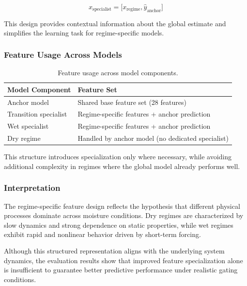 \begin{equation}
x_{\text{specialist}} = \big[x_{\text{regime}}, \hat{y}_{\text{anchor}}\big]
\end{equation}

This design provides contextual information about the global estimate and simplifies the learning task for regime-specific models.

\subsubsection*{Feature Usage Across Models}

\begin{table}[H]
\centering
\begin{tabular}{ll}
\toprule
\textbf{Model Component} & \textbf{Feature Set} \\
\midrule
Anchor model & Shared base feature set (28 features) \\
Transition specialist & Regime-specific features + anchor prediction \\
Wet specialist & Regime-specific features + anchor prediction \\
Dry regime & Handled by anchor model (no dedicated specialist) \\
\bottomrule
\end{tabular}
\caption{Feature usage across model components.}
\end{table}

This structure introduces specialization only where necessary, while avoiding additional complexity in regimes where the global model already performs well.

\subsubsection*{Interpretation}

The regime-specific feature design reflects the hypothesis that different physical processes dominate across moisture conditions. Dry regimes are characterized by slow dynamics and strong dependence on static properties, while wet regimes exhibit rapid and nonlinear behavior driven by short-term forcing.

Although this structured representation aligns with the underlying system dynamics, the evaluation results show that improved feature specialization alone is insufficient to guarantee better predictive performance under realistic gating conditions.
